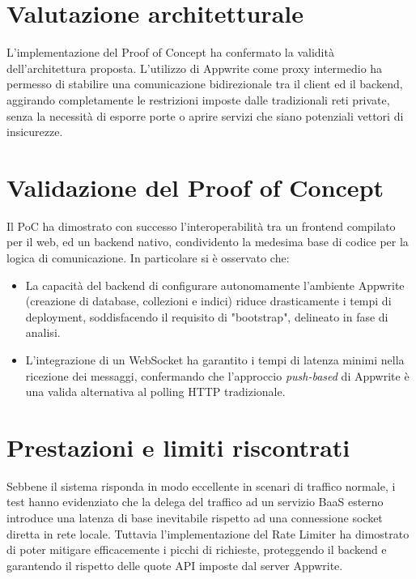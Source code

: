 \documentclass[a4paper, 11pt, twoside]{report}
\begin{document}
\newpage

\section{Valutazione architetturale}

L'implementazione del Proof of Concept ha confermato la validità dell'architettura proposta. L'utilizzo di Appwrite come proxy
intermedio ha permesso di stabilire una comunicazione bidirezionale tra il client ed il backend, aggirando completamente le
restrizioni imposte dalle tradizionali reti private, senza la necessità di esporre porte o aprire servizi che siano
potenziali vettori di insicurezze.

\section{Validazione del Proof of Concept}

Il PoC ha dimostrato con successo l'interoperabilità tra un frontend compilato per il web, ed un backend nativo, condividento la
medesima base di codice per la logica di comunicazione. In particolare si è osservato che:
\begin{itemize}
\item La capacità del backend di configurare autonomamente l'ambiente Appwrite (creazione di database, collezioni e indici) riduce
drasticamente i tempi di deployment, soddisfacendo il requisito di "bootstrap", delineato in fase di analisi.
\item L'integrazione di un WebSocket ha garantito i tempi di latenza minimi nella ricezione dei messaggi, confermando che
l'approccio \textit{push-based} di Appwrite è una valida alternativa al polling HTTP tradizionale.
\end{itemize}

\section{Prestazioni e limiti riscontrati}

Sebbene il sistema risponda in modo eccellente in scenari di traffico normale, i test hanno evidenziato che la delega del traffico
ad un servizio BaaS esterno introduce una latenza di base inevitabile rispetto ad una connessione socket diretta in rete locale.
Tuttavia l'implementazione del Rate Limiter ha dimostrato di poter mitigare efficacemente i picchi di richieste, proteggendo
il backend e garantendo il rispetto delle quote API imposte dal server Appwrite.
\end{document}
